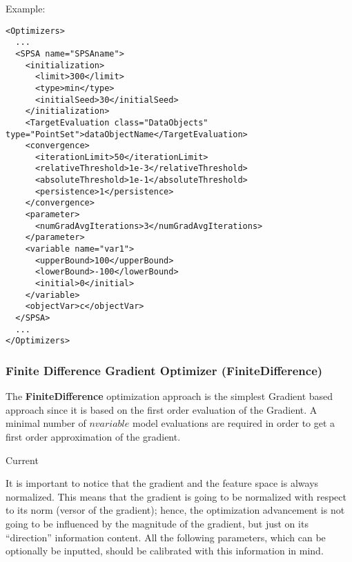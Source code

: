Example:
\begin{lstlisting}[style=XML]
<Optimizers>
  ...
  <SPSA name="SPSAname">
    <initialization>
      <limit>300</limit>
      <type>min</type>
      <initialSeed>30</initialSeed>
    </initialization>
    <TargetEvaluation class="DataObjects" type="PointSet">dataObjectName</TargetEvaluation>
    <convergence>
      <iterationLimit>50</iterationLimit>
      <relativeThreshold>1e-3</relativeThreshold>
      <absoluteThreshold>1e-1</absoluteThreshold>
      <persistence>1</persistence>
    </convergence>
    <parameter>
      <numGradAvgIterations>3</numGradAvgIterations>
    </parameter>
    <variable name="var1">
      <upperBound>100</upperBound>
      <lowerBound>-100</lowerBound>
      <initial>0</initial>
    </variable>
    <objectVar>c</objectVar>
  </SPSA>
  ...
</Optimizers>
\end{lstlisting}


\subsubsection{Finite Difference Gradient Optimizer (FiniteDifference)}
\label{subsubsubsec:FiniteDifference}
The \textbf{FiniteDifference} optimization approach is  the simplest Gradient based approach since it is based on the
first order evaluation of the Gradient.  A minimal number of $n variable$
model evaluations are required in order to get a first order approximation of the gradient.

Current 

It is important to notice that the gradient and the feature space is always normalized. This means that the gradient is going to be
normalized with respect to its norm (versor of the gradient); hence, the optimization advancement is not going to be influenced by the
magnitude of the gradient, but just on its ``direction'' information content. All the following parameters, which can be optionally be inputted, should be calibrated with this information in mind.
%

